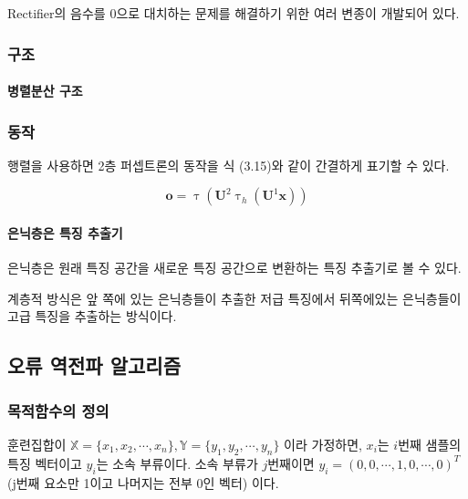 \documentclass [12pt] {oblivoir}
\let\oldsubsubsection=\subsubsection
\renewcommand{\subsubsection}
{
  \filbreak
  \oldsubsubsection
}
\begin{document}
Rectifier의 음수를 0으로 대치하는 문제를 해결하기 위한 여러 변종이 개발되어 있다.

\subsubsection{구조}

\paragraph*{병렬분산 구조}\mbox{}

\vspace{3mm}

\subsubsection{동작}

행렬을 사용하면 2층 퍼셉트론의 동작을 식 (3.15)와 같이 간결하게 표기할 수 있다.

\begin{equation} \tag{3.15}
  \mathbf{o} = \uptau(\mathbf{U}^{2}\uptau_{h}(\mathbf{U}^{1}\mathbf{x}))
\end{equation}

\paragraph*{은닉층은 특징 추출기}\mbox{}

은닉층은 원래 특징 공간을 새로운 특징 공간으로 변환하는 특징 추출기로 볼 수 있다.

계층적 방식은 앞 쪽에 있는 은닉층들이 추출한 저급 특징에서 뒤쪽에있는 은닉층들이 고급 특징을 추출하는 방식이다.

\vspace{3mm}

\subsection{오류 역전파 알고리즘}

\subsubsection{목적함수의 정의}

\;훈련집합이 $\mathds{X} = \{x_{1}, x_{2}, \cdots, x_{n}\}, \mathds{Y} = \{y_{1}, y_{2}, \cdots, y_{n}\}$ 이라 가정하면,
$x_{i}$는 $i$번째 샘플의 특징 벡터이고 $y_{i}$는 소속 부류이다.
소속 부류가 $j$번째이면 $y_{i} = (0, 0, \cdots, 1, 0, \cdots, 0)^{T}$ (j번째 요소만 1이고 나머지는 전부 0인 벡터) 이다.
\end{document}
